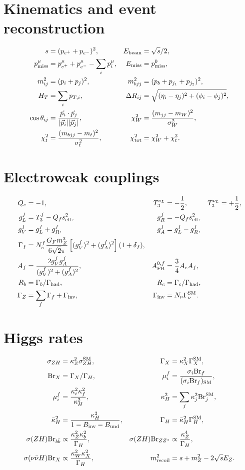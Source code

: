 \documentclass[11pt,a4paper]{report}
\newcommand{\br}{\mathrm{Br}}
\begin{document}
\section{Kinematics and event reconstruction}
\begin{align}
s&=(p_{e^+}+p_{e^-})^2, & E_{\rm beam}&=\sqrt{s}/2,\\
p_{\rm miss}^\mu&=p_{e^+}^\mu+p_{e^-}^\mu-\sum_i p_i^\mu, & E_{\rm miss}&=p_{\rm miss}^0,\\
m_{ij}^2&=(p_i+p_j)^2, & m_{bjj}^2&=(p_b+p_{j_1}+p_{j_2})^2,\\
H_T&=\sum_i p_{T,i}, & \Delta R_{ij}&=\sqrt{(\eta_i-\eta_j)^2+(\phi_i-\phi_j)^2},\\
\cos\theta_{ij}&=\frac{\vec p_i\cdot\vec p_j}{|\vec p_i||\vec p_j|}, & \chi^2_W&=\frac{(m_{jj}-m_W)^2}{\sigma_W^2},\\
\chi^2_t&=\frac{(m_{bjj}-m_t)^2}{\sigma_t^2}, & \chi^2_{\rm tot}&=\chi^2_W+\chi^2_t.
\end{align}
\section{Electroweak couplings}
\begin{align}
Q_e&=-1, & T_3^{e_L}&=-\frac12, & T_3^{\nu_L}&=+\frac12,\\
g_L^f&=T_3^f-Q_f s_{\rm eff}^2, & g_R^f&=-Q_f s_{\rm eff}^2,\\
g_V^f&=g_L^f+g_R^f, & g_A^f&=g_L^f-g_R^f,\\
\Gamma_f&=N_c^f\frac{G_Fm_Z^3}{6\sqrt2\pi}\left[(g_V^f)^2+(g_A^f)^2\right](1+\delta_f),\\
A_f&=\frac{2g_V^fg_A^f}{(g_V^f)^2+(g_A^f)^2}, & A_{\rm FB}^{0,f}&=\frac34 A_eA_f,\\
R_b&=\Gamma_b/\Gamma_{\rm had}, & R_c&=\Gamma_c/\Gamma_{\rm had},\\
\Gamma_Z&=\sum_f\Gamma_f+\Gamma_{\rm inv}, & \Gamma_{\rm inv}&=N_\nu\Gamma_\nu^{\rm SM}.
\end{align}
\section{Higgs rates}
\begin{align}
\sigma_{ZH}&=\kappa_Z^2\sigma_{ZH}^{\rm SM}, & \Gamma_X&=\kappa_X^2\Gamma_X^{\rm SM},\\
\br_X&=\Gamma_X/\Gamma_H, & \mu_i^f&=\frac{\sigma_i\br_f}{(\sigma_i\br_f)_{\rm SM}},\\
\mu_i^f&=\frac{\kappa_i^2\kappa_f^2}{\kappa_H^2}, & \kappa_H^2&=\sum_j\kappa_j^2\br_j^{\rm SM},\\
\bar\kappa_H^2&=\frac{\kappa_H^2}{1-B_{\rm inv}-B_{\rm und}}, & \Gamma_H&=\bar\kappa_H^2\Gamma_H^{\rm SM},\\
\sigma(ZH)\br_{b\bar b}&\propto\frac{\kappa_Z^2\kappa_b^2}{\Gamma_H}, & \sigma(ZH)\br_{ZZ^*}&\propto\frac{\kappa_Z^4}{\Gamma_H},\\
\sigma(\nu\bar\nu H)\br_X&\propto\frac{\kappa_W^2\kappa_X^2}{\Gamma_H}, & m_{\rm recoil}^2&=s+m_Z^2-2\sqrt{s}E_Z.
\end{align}
\end{document}
